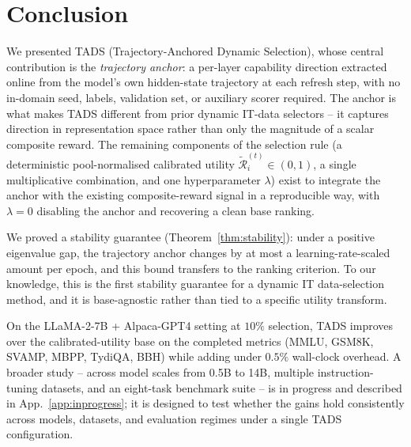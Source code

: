 \section{Conclusion}
\label{sec:conclusion}

We presented \textsc{TADS} (Trajectory-Anchored Dynamic Selection),
whose central contribution is the \emph{trajectory anchor}: a
per-layer capability direction extracted online from the model's
own hidden-state trajectory at each refresh step, with no
in-domain seed, labels, validation set, or auxiliary scorer
required. The anchor is what makes \textsc{TADS} different from
prior dynamic IT-data selectors -- it captures direction in
representation space rather than only the magnitude of a scalar
composite reward. The remaining components of the selection rule
(a deterministic pool-normalised calibrated utility
$\tilde{\mathcal{R}}_i^{(t)} \in (0,1)$, a single multiplicative
combination, and one hyperparameter $\lambda$) exist to integrate
the anchor with the existing composite-reward signal in a
reproducible way, with $\lambda{=}0$ disabling the anchor and
recovering a clean base ranking.

We proved a stability guarantee (Theorem~\ref{thm:stability}):
under a positive eigenvalue gap, the trajectory anchor changes by
at most a learning-rate-scaled amount per epoch, and this bound
transfers to the ranking criterion. To our knowledge, this is the
first stability guarantee for a dynamic IT data-selection method,
and it is base-agnostic rather than tied to a specific utility
transform.

On the LLaMA-2-7B + Alpaca-GPT4 setting at $10\%$ selection,
\textsc{TADS} improves over the calibrated-utility base on the
completed metrics (MMLU, GSM8K, SVAMP, MBPP, TydiQA, BBH) while
adding under $0.5\%$ wall-clock overhead. A broader study --
across model scales from 0.5B to 14B, multiple instruction-tuning
datasets, and an eight-task benchmark suite -- is in progress and
described in App.~\ref{app:inprogress}; it is designed to test
whether the gains hold consistently across models, datasets, and
evaluation regimes under a single \textsc{TADS} configuration.
